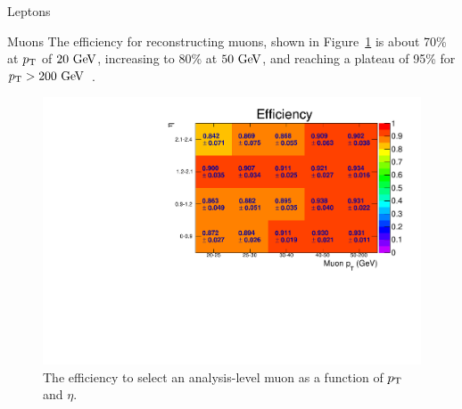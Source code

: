 \begin{section}{Leptons}
\begin{subsection}{Muons}
The efficiency for reconstructing muons, shown in Figure~\ref{fig:muon_eff} is about 70\% at $p_{\mathrm{T}}$ of $20~\mathrm{Ge\kern -0.1em V}$, increasing to 80\% at $50~\mathrm{Ge\kern -0.1em V}$, and reaching a plateau of 95\% for $p_{\mathrm{T}} > 200~\mathrm{Ge\kern -0.1em V}$~\cite{Chatrchyan:2012xi}.

\begin{figure}[tbp!]
\centering
\includegraphics[angle=0,width=0.80\columnwidth]{fig/muon_eff.pdf}
\caption{The efficiency to select an analysis-level muon as a function of $p_{\mathrm{T}}$ and $\eta$.}
\label{fig:muon_eff}
\end{figure}

\end{subsection}

\end{section}

